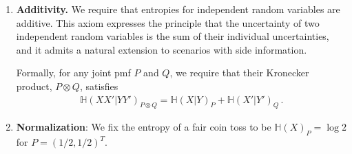 \documentclass[aps,pra,11pt,onecolumn,nofootinbib,tightenlines]{revtex4-2}
\theoremstyle{definition}
\renewcommand{\H}{\mathbb{H}}
\begin{document}
\begin{enumerate}
    \smallskip

   When representing a joint probability mass function as a matrix, mixing channels acting on the system $X$ can be described by left multiplication with a doubly stochastic matrix $S$. In addition, channels acting on the side information correspond to right multiplication by a row-stochastic matrix $D$. Finally, conditional operations can be represented by a family of row sub-stochastic matrices $D_i$ acting on the right, whose sum $\sum_i D_i$ is row-stochastic, together with a corresponding family of doubly stochastic matrices $S_i$ acting on the left (see~\cite{gour2018conditional} for more details).
    Explicitly, conditionally mixing channels from $m \times n$ matrices $P$ to $m \times n'$ matrices $Q$ act as
    \begin{align}
        P \mapsto Q = \sum_{i=1}^k S_i P D_i \,, \label{eq:intro/mixing}
    \end{align}
    where $S_i$ are doubly stochastic $m \times m$ matrices for all $i$ and $D_i$ are sub-stochastic $n \times n'$ matrices such that their sum $\sum_{i=1}^k D_i$ is row-stochastic.   We require that for any conditionally mixing channel, any $P$, and $Q$ as defined in~\eqref{eq:intro/mixing}, it holds that
    \begin{align}
        \H(X|Y)_P \leq \H(X|Y')_Q \,.
    \end{align}
\label{it: conditionally mixing channels}
    \item \textbf{Additivity.} We require that entropies for independent random variables are additive. This axiom expresses the principle that the uncertainty of two independent random variables is the sum of their individual uncertainties, and it admits a natural extension to scenarios with side information.

    \smallskip
    
    Formally, for any joint pmf $P$ and $Q$, we require that their Kronecker product, $P \otimes Q$, satisfies
    \begin{align}
        \H(XX'|YY')_{P\otimes Q} = \H(X|Y)_P + \H(X'|Y')_Q \,.
    \end{align}

    \item \textbf{Normalization}: We fix the entropy of a fair coin toss to be $\H(X)_P = \log 2$ for $P = (1/2,1/2)^T$. 

\end{enumerate}

\end{document}
